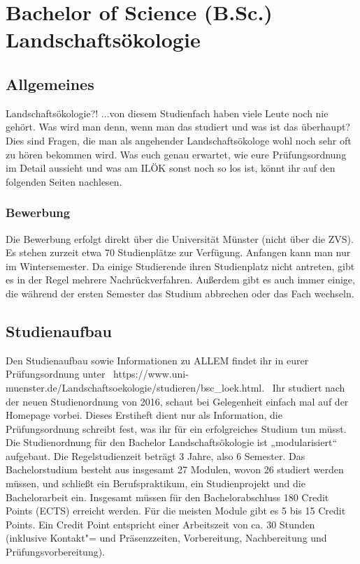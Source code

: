 \chapter{Bachelor of Science (B.Sc.) Landschaftsökologie}

\section{Allgemeines}
Landschaftsökologie?! ...von diesem Studienfach haben viele Leute noch nie gehört. Was wird man denn, wenn man das studiert und was ist das überhaupt? Dies sind Fragen, die man als angehender Landschaftsökologe wohl noch sehr oft zu hören bekommen wird. Was euch genau erwartet, wie eure Prüfungsordnung im Detail aussieht und was am ILÖK sonst noch so los ist, könnt ihr auf den folgenden Seiten nachlesen.

\subsection*{Bewerbung}
Die Bewerbung erfolgt direkt über die Universität Münster (nicht über die ZVS). Es stehen zurzeit etwa 70 Studienplätze zur Verfügung. Anfangen kann man nur im Wintersemester. Da einige Studierende ihren Studienplatz nicht antreten, gibt es in der Regel mehrere Nachrückverfahren. Außerdem gibt es auch immer einige, die während der ersten Semester das Studium abbrechen oder das Fach wechseln.

\section{Studienaufbau}
Den Studienaufbau sowie Informationen zu ALLEM findet ihr in eurer Prüfungsordnung unter \ https://www.uni-muenster.de/Landschaftsoekologie/studieren/bsc_loek.html. \ Ihr studiert nach der neuen Studienordnung von 2016, schaut bei Gelegenheit einfach mal auf der Homepage vorbei. Dieses Erstiheft dient nur als Information, die Prüfungsordnung schreibt fest, was ihr für ein erfolgreiches Studium tun müsst. 
Die Studienordnung für den Bachelor Landschaftsökologie ist „modularisiert“ aufgebaut. Die Regelstudienzeit beträgt 3 Jahre, also 6 Semester. Das Bachelorstudium besteht aus insgesamt 27 Modulen, wovon 26 studiert werden müssen, und schließt ein Berufspraktikum, ein Studienprojekt und die Bachelorarbeit ein. Insgesamt müssen für den Bachelorabschluss 180 Credit Points (ECTS) erreicht werden. Für die meisten Module gibt es 5 bis 15 Credit Points. Ein Credit Point entspricht einer Arbeitszeit von ca. 30 Stunden (inklusive Kontakt"= und Präsenzzeiten, Vorbereitung, Nachbereitung und Prüfungsvorbereitung). 

